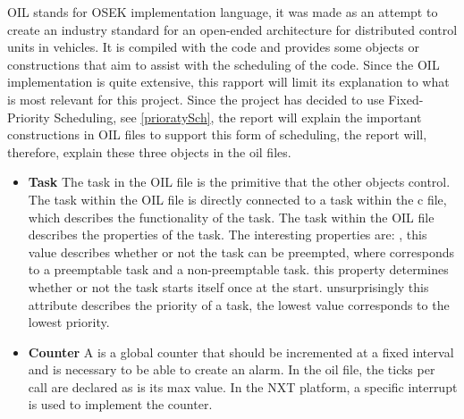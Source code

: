 OIL stands for OSEK implementation language, it was made as an attempt to create an industry standard for an open-ended architecture for distributed control units in vehicles\cite{OILManual}. It is compiled with the code and provides some objects or constructions that aim to assist with the scheduling of the code. Since the OIL implementation is quite extensive, this rapport will limit its explanation to what is most relevant for this project. Since the project has decided to use Fixed-Priority Scheduling, see \ref{prioratySch}, the report will explain the important constructions in OIL files to support this form of scheduling, the report will, therefore, explain these three objects in the oil files.

\begin{itemize}
    \item{\textbf{Task}}
    The task in the OIL file is the primitive that the other objects control. The task within the OIL file is directly connected to a task within the c file, which describes the functionality of the task. The task within the OIL file describes the properties of the task. The interesting properties are: , this value describes whether or not the task can be preempted, where  corresponds to a preemptable task and  a non-preemptable task.  this property determines whether or not the task starts itself once at the start. 
     unsurprisingly this attribute describes the priority of a task, the lowest value corresponds to the lowest priority.
    \item{\textbf{Counter}}
    A  is a global counter that should be incremented at a fixed interval and is necessary to be able to create an alarm. In the oil file, the ticks per call are declared as is its max value. In the NXT platform, a specific interrupt is used to implement the counter.
    

\end{itemize}
